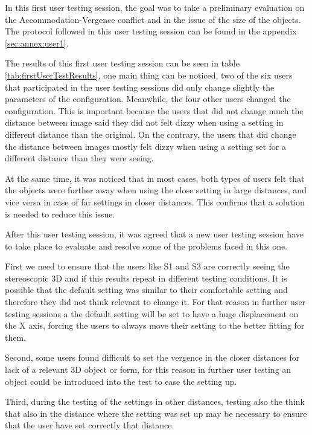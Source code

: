 \documentclass[10pt,a4paper,twocolumn,twoside]{article}
\begin{document}
	In this first user testing session, the goal was to take a preliminary evaluation on the Accommodation-Vergence conflict and in the issue of the size of the objects. The protocol followed in this user testing session can be found in the appendix \ref{sec:annex:user1}.
	
	The results of this first user testing session can be seen in table \ref{tab:firstUserTestResults}, one main thing can be noticed, two of the six users that participated in the user testing sessions did only change slightly the parameters of the configuration. Meanwhile, the four other users changed the configuration. This is important because the users that did not change much the distance between image said they did not felt dizzy when using a setting in different distance than the original. On the contrary, the users that did change the distance between images mostly felt dizzy when using a setting set for a different distance than they were seeing.
	
	At the same time, it was noticed that in most cases, both types of users felt that the objects were further away when using the close setting in large distances, and vice versa in case of far settings in closer distances. This confirms that a solution is needed to reduce this issue. 
	
	After this user testing session, it was agreed that a new user testing session have to take place to evaluate and resolve some of the problems faced in this one. 

	First we need to ensure that the users like S1 and S3 are correctly seeing the stereoscopic 3D and if this results repeat in different testing conditions. It is possible that the default setting was similar to their comfortable setting and therefore they did not think relevant to change it. For that reason in further user testing sessions a the default setting will be set to have a huge displacement on the X axis, forcing the users to always move their setting to the better fitting for them.
	
	Second, some users found difficult to set the vergence in the closer distances for lack of a relevant 3D object or form, for this reason in further user testing an object could be introduced into the test to ease the setting up. 
	
	Third, during the testing of the settings in other distances, testing also the think that  also in the distance where the setting was set up may be necessary to ensure that the user have set correctly that distance.
	
\end{document}
